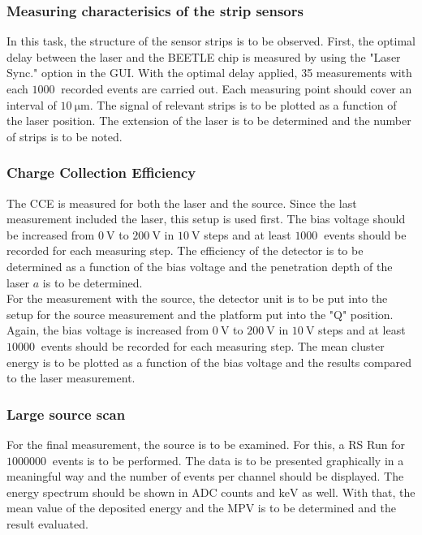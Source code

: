 \subsubsection{Measuring characterisics of the strip sensors}
\label{measure:4}
In this task, the structure of the sensor strips is to be observed. First, the optimal delay between the laser
and the BEETLE chip is measured by using the "Laser Sync." option in the GUI. With the optimal delay applied, 
35 measurements with each $\qty{1000}{}$ recorded events are carried out. Each measuring point should cover an interval
of $\qty{10}{\micro\metre}$. The signal of relevant strips is to be plotted as a function of the laser position. 
The extension of the laser is to be determined and the number of strips is to be noted.

\subsubsection{Charge Collection Efficiency}
\label{measure:5}
The CCE is measured for both the laser and the source. Since the last measurement included the laser, this setup is used
first. The bias voltage should be increased from $\qty{0}{\volt}$ to $\qty{200}{\volt}$ in $\qty{10}{\volt}$ steps and 
at least $\qty{1000}{}$ events should be recorded for each measuring step. The efficiency of the detector is to be determined
as a function of the bias voltage and the penetration depth of the laser $a$ is to be determined.\\
For the measurement with the source, the detector unit is to be put into the setup for the source measurement and the platform
put into the "Q" position. Again, the bias voltage is increased from $\qty{0}{\volt}$ to $\qty{200}{\volt}$ in $\qty{10}{\volt}$ steps
and at least $\qty{10000}{}$ events should be recorded for each measuring step. The mean cluster energy is to be plotted as a function
of the bias voltage and the results compared to the laser measurement.

\subsubsection{Large source scan}
\label{measure:6}
For the final measurement, the source is to be examined. For this, a RS Run for $\qty{1000000}{}$ events is to be performed.
The data is to be presented graphically in a meaningful way and the number of events per channel should be displayed.
The energy spectrum should be shown in ADC counts and $\unit{\kilo\electronvolt}$ as well. With that, the mean value of the 
deposited energy and the MPV is to be determined and the result evaluated.
